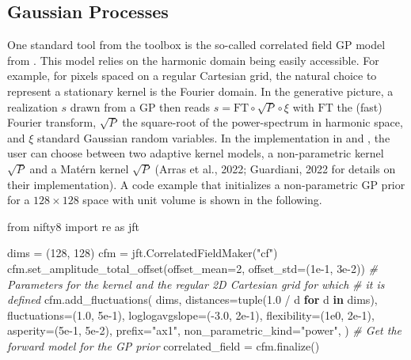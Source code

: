 \documentclass[10pt,a4paper,onecolumn]{article}
\let\textttOrig=\texttt
\def\texttt#1{\expandafter\textttOrig{\seqsplit{#1}}}
\newenvironment{Shaded}{}{}
\newcommand{\BuiltInTok}[1]{#1}
\newcommand{\CommentTok}[1]{\textcolor[rgb]{0.38,0.63,0.69}{\textit{#1}}}
\newcommand{\ControlFlowTok}[1]{\textcolor[rgb]{0.00,0.44,0.13}{\textbf{#1}}}
\newcommand{\DecValTok}[1]{\textcolor[rgb]{0.25,0.63,0.44}{#1}}
\newcommand{\FloatTok}[1]{\textcolor[rgb]{0.25,0.63,0.44}{#1}}
\newcommand{\ImportTok}[1]{#1}
\newcommand{\KeywordTok}[1]{\textcolor[rgb]{0.00,0.44,0.13}{\textbf{#1}}}
\newcommand{\NormalTok}[1]{#1}
\newcommand{\OperatorTok}[1]{\textcolor[rgb]{0.40,0.40,0.40}{#1}}
\newcommand{\StringTok}[1]{\textcolor[rgb]{0.25,0.44,0.63}{#1}}
\begin{document}
\hypertarget{gaussian-processes}{%
\subsection{Gaussian Processes}\label{gaussian-processes}}

One standard tool from the \texttt{NIFTy.re} toolbox is the so-called
correlated field GP model from \texttt{NIFTy}. This model relies on the
harmonic domain being easily accessible. For example, for pixels spaced
on a regular Cartesian grid, the natural choice to represent a
stationary kernel is the Fourier domain. In the generative picture, a
realization \(s\) drawn from a GP then reads
\(s = \mathrm{FT} \circ \sqrt{P} \circ \xi\) with \(\mathrm{FT}\) the
(fast) Fourier transform, \(\sqrt{P}\) the square-root of the
power-spectrum in harmonic space, and \(\xi\) standard Gaussian random
variables. In the implementation in \texttt{NIFTy.re} and
\texttt{NIFTy}, the user can choose between two adaptive kernel models,
a non-parametric kernel \(\sqrt{P}\) and a Matérn kernel \(\sqrt{P}\)
(Arras et al., 2022; Guardiani, 2022 for details on their
implementation). A code example that initializes a non-parametric GP
prior for a \(128 \times 128\) space with unit volume is shown in the
following.

\begin{Shaded}
\begin{Highlighting}[]
\ImportTok{from}\NormalTok{ nifty8 }\ImportTok{import}\NormalTok{ re }\ImportTok{as}\NormalTok{ jft}

\NormalTok{dims }\OperatorTok{=}\NormalTok{ (}\DecValTok{128}\NormalTok{, }\DecValTok{128}\NormalTok{)}
\NormalTok{cfm }\OperatorTok{=}\NormalTok{ jft.CorrelatedFieldMaker(}\StringTok{"cf"}\NormalTok{)}
\NormalTok{cfm.set\_amplitude\_total\_offset(offset\_mean}\OperatorTok{=}\DecValTok{2}\NormalTok{, offset\_std}\OperatorTok{=}\NormalTok{(}\FloatTok{1e{-}1}\NormalTok{, }\FloatTok{3e{-}2}\NormalTok{))}
\CommentTok{\# Parameters for the kernel and the regular 2D Cartesian grid for which}
\CommentTok{\# it is defined}
\NormalTok{cfm.add\_fluctuations(}
\NormalTok{  dims,}
\NormalTok{  distances}\OperatorTok{=}\BuiltInTok{tuple}\NormalTok{(}\FloatTok{1.0} \OperatorTok{/}\NormalTok{ d }\ControlFlowTok{for}\NormalTok{ d }\KeywordTok{in}\NormalTok{ dims),}
\NormalTok{  fluctuations}\OperatorTok{=}\NormalTok{(}\FloatTok{1.0}\NormalTok{, }\FloatTok{5e{-}1}\NormalTok{),}
\NormalTok{  loglogavgslope}\OperatorTok{=}\NormalTok{(}\OperatorTok{{-}}\FloatTok{3.0}\NormalTok{, }\FloatTok{2e{-}1}\NormalTok{),}
\NormalTok{  flexibility}\OperatorTok{=}\NormalTok{(}\FloatTok{1e0}\NormalTok{, }\FloatTok{2e{-}1}\NormalTok{),}
\NormalTok{  asperity}\OperatorTok{=}\NormalTok{(}\FloatTok{5e{-}1}\NormalTok{, }\FloatTok{5e{-}2}\NormalTok{),}
\NormalTok{  prefix}\OperatorTok{=}\StringTok{"ax1"}\NormalTok{,}
\NormalTok{  non\_parametric\_kind}\OperatorTok{=}\StringTok{"power"}\NormalTok{,}
\NormalTok{)}
\CommentTok{\# Get the forward model for the GP prior}
\NormalTok{correlated\_field }\OperatorTok{=}\NormalTok{ cfm.finalize()}
\end{Highlighting}
\end{Shaded}
\end{document}
